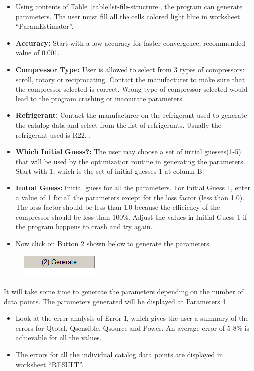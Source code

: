 \begin{itemize}
\item
  Using contents of Table~\ref{table:lst-file-structure}, the program can generate parameters. The user must fill all the cells colored light blue in worksheet ``ParamEstimator''.
\item
  \textbf{Accuracy:} Start with a low accuracy for faster convergence, recommended value of 0.001.
\item
  \textbf{Compressor Type:} User is allowed to select from 3 types of compressors: scroll, rotary or reciprocating. Contact the manufacturer to make sure that the compressor selected is correct. Wrong type of compressor selected would lead to the program crashing or inaccurate parameters.
\item
  \textbf{Refrigerant:} Contact the manufacturer on the refrigerant used to generate the catalog data and select from the list of refrigerants. Usually the refrigerant used is R22. .
\item
  \textbf{Which Initial Guess?:} The user may choose a set of initial guesses(1-5) that will be used by the optimization routine in generating the parameters. Start with 1, which is the set of initial guesses 1 at column B.
\item
  \textbf{Initial Guess:} Initial guess for all the parameters. For Initial Guess 1, enter a value of 1 for all the parameters except for the loss factor (less than 1.0). The loss factor should be less than 1.0 because the efficiency of the compressor should be less than 100\%. Adjust the values in Initial Guess 1 if the program happens to crash and try again.
\item
  Now click on Button 2 shown below to generate the parameters.
\end{itemize}

\begin{figure}[htbp]
\centering
\includegraphics{media/image049.png}
\caption{}
\end{figure}

It will take some time to generate the parameters depending on the number of data points. The parameters generated will be displayed at Parameters 1.

\begin{itemize}
\item
  Look at the error analysis of Error 1, which gives the user a summary of the errors for Qtotal, Qsensible, Qsource and Power. An average error of 5-8\% is achievable for all the values.
\item
  The errors for all the individual catalog data points are displayed in worksheet ``RESULT''.
\end{itemize}

